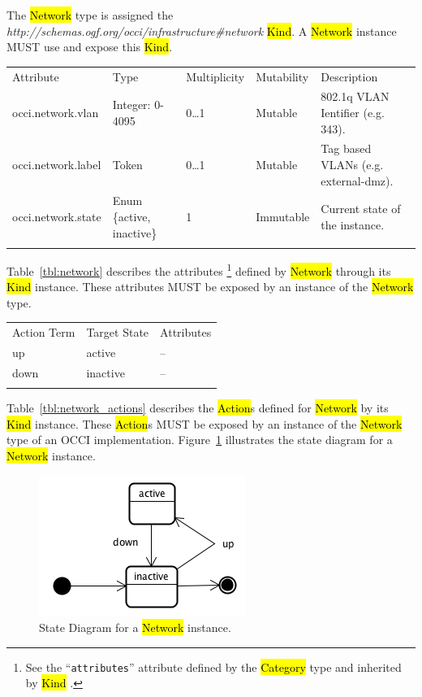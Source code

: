 \documentclass[10pt,a4paper]{article}
\begin{document}
The \hl{Network} type is assigned the
\textit{http://schemas.ogf.org/occi/infrastructure\#network} \hl{Kind}. A
\hl{Network} instance MUST use and expose this \hl{Kind}.

{
	\begin{tabular}{lllll}
	\toprule
	Attribute&Type&Multi\-plicity&Mutability&Description\\
	\colrule
	occi.network.vlan & Integer: 0-4095 & 0\ldots1 & Mutable 
	& 802.1q VLAN Ientifier (e.g. 343).\\
	occi.network.label & Token & 0\ldots1 & Mutable 
	& Tag based VLANs (e.g. external-dmz).\\
	occi.network.state & Enum \{active, inactive\} & 1 & Immutable 
	& Current state of the instance.\\
	\botrule
	\end{tabular}
}
Table~\ref{tbl:network} describes the attributes%
\footnote{See the ``{\tt attributes}'' attribute defined by the \hl{Category}
type and inherited by \hl{Kind} \cite{occi:core}.} 
defined by \hl{Network} through its \hl{Kind} instance. These attributes
MUST be exposed by an instance of the \hl{Network} type.

{
	\begin{tabular}{lll}
	\toprule
	Action Term&Target State&Attributes\\
	\colrule
	up & active & --\\
	down & inactive & --\\
	\botrule
	\end{tabular}
}

Table~\ref{tbl:network_actions} describes the \hl{Action}s defined for
\hl{Network} by its \hl{Kind} instance. These \hl{Action}s MUST be exposed 
by an instance of the \hl{Network} type of an OCCI implementation. 
Figure~\ref{fig:network_state} illustrates the state diagram for a \hl{Network} instance.

\begin{figure}[!h]
	\centering
	\includegraphics[scale=0.4]{figs/network-state.png}
	\caption{State Diagram for a \hl{Network} instance.}
	\label{fig:network_state}
\end{figure}
\end{document}
